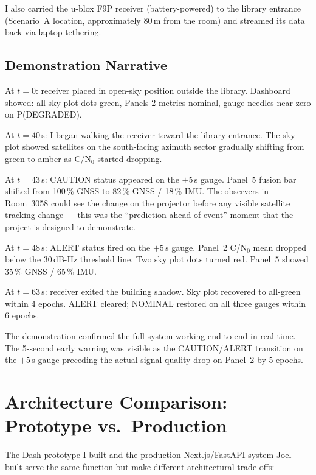 \documentclass[12pt,a4paper]{article}
\begin{document}
I also carried the u-blox F9P receiver (battery-powered) to the library entrance
(Scenario~A location, approximately 80\,m from the room) and streamed its data back
via laptop tethering.

\subsection{Demonstration Narrative}

At $t = 0$: receiver placed in open-sky position outside the library.
Dashboard showed: all sky plot dots green, Panels 2 metrics nominal,
gauge needles near-zero on P(DEGRADED).

At $t = 40$\,s: I began walking the receiver toward the library entrance.
The sky plot showed satellites on the south-facing azimuth sector gradually shifting
from green to amber as C/N$_0$ started dropping.

At $t = 43$\,s: CAUTION status appeared on the $+5$\,s gauge.
Panel~5 fusion bar shifted from 100\,\% GNSS to 82\,\% GNSS / 18\,\% IMU.
The observers in Room~3058 could see the change on the projector before any visible
satellite tracking change --- this was the ``prediction ahead of event'' moment that
the project is designed to demonstrate.

At $t = 48$\,s: ALERT status fired on the $+5$\,s gauge.
Panel~2 C/N$_0$ mean dropped below the 30\,dB-Hz threshold line.
Two sky plot dots turned red.
Panel~5 showed 35\,\% GNSS / 65\,\% IMU.

At $t = 63$\,s: receiver exited the building shadow.
Sky plot recovered to all-green within 4 epochs.
ALERT cleared; NOMINAL restored on all three gauges within 6 epochs.

The demonstration confirmed the full system working end-to-end in real time.
The 5-second early warning was visible as the CAUTION/ALERT transition on the $+5$\,s
gauge preceding the actual signal quality drop on Panel~2 by 5 epochs.


\section{Architecture Comparison: Prototype vs.\ Production}

The Dash prototype I built and the production Next.js/FastAPI system Joel built serve
the same function but make different architectural trade-offs:
\end{document}
